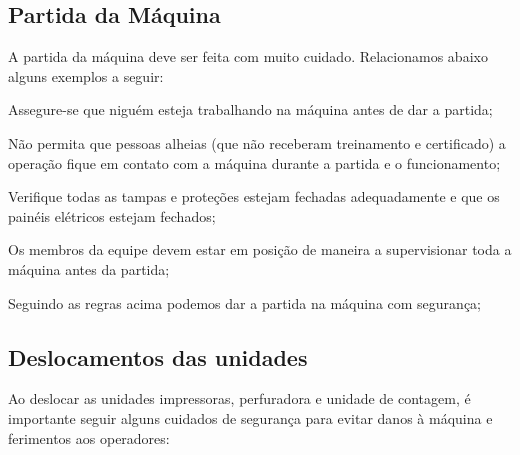 \subsection{Partida da Máquina}

A partida da máquina deve ser feita com muito cuidado. Relacionamos abaixo alguns exemplos a seguir:

\begin{generalSafetyToStartTheMachine}


    \item Assegure-se que niguém esteja trabalhando na máquina antes de dar a partida;
    \item Não permita que pessoas alheias (que não receberam treinamento e certificado) a operação fique em
contato com a máquina durante a partida e o funcionamento;
    \item Verifique todas as tampas e proteções estejam fechadas adequadamente e que os painéis elétricos
estejam fechados;
    \item Os membros da equipe devem estar em posição de maneira a supervisionar toda a máquina antes da
partida;
    \item Seguindo as regras acima podemos dar a partida na máquina com segurança;

\end{generalSafetyToStartTheMachine}

\subsection{Deslocamentos das unidades}

Ao deslocar as unidades impressoras, perfuradora e unidade de contagem, é importante seguir alguns cuidados de segurança para evitar danos à máquina e ferimentos aos operadores:


